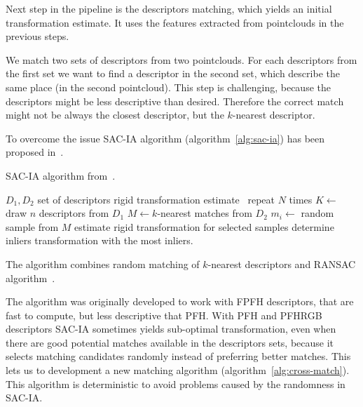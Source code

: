 Next step in the pipeline is the descriptors matching, which yields an initial transformation estimate. It uses the features extracted from pointclouds in the previous steps.

We match two sets of descriptors from two pointclouds. For each descriptors from the first set we want to find a descriptor in the second set, which describe the same place (in the second pointcloud). This step is challenging, because the descriptors might be less descriptive than desired. Therefore the correct match might not be always the closest descriptor, but the $k$-nearest descriptor.

To overcome the issue \gls{SAC-IA} algorithm (algorithm~\ref{alg:sac-ia}) has been proposed in~\citet{rusu2009fpfh}.

\begin{algorithm}
    \caption[\gls{SAC-IA}]{\gls{SAC-IA} algorithm from~\citet{rusu2009fpfh}.}
    \label{alg:sac-ia}
    \begin{algorithmic}[1]
        \Require $D_1, D_2$ set of descriptors
        \Ensure rigid transformation estimate
            \Loop~repeat $N$ times
                \State $K \gets$ draw $n$ descriptors from $D_1$
                    \State $M \gets k$-nearest matches from $D_2$
                    \State $m_i \gets$ random sample from $M$
                \EndFor
                \State estimate rigid transformation for selected samples
                \State determine inliers
            \EndLoop
            \State \Return transformation with the most inliers.
        \EndFunction
    \end{algorithmic}
\end{algorithm}

The algorithm combines random matching of $k$-nearest descriptors and \gls{RANSAC} algorithm~\citet{fischler1981ransac}.


The algorithm was originally developed to work with \gls{FPFH} descriptors, that are fast to compute, but less descriptive that \gls{PFH}. With \gls{PFH} and \gls{PFHRGB} descriptors \gls{SAC-IA} sometimes yields sub-optimal transformation, even when there are good potential matches available in the descriptors sets, because it selects matching candidates randomly instead of preferring better matches. This lets us to development a new matching algorithm (algorithm~\ref{alg:cross-match}). This algorithm is deterministic to avoid problems caused by the randomness in \gls{SAC-IA}.

